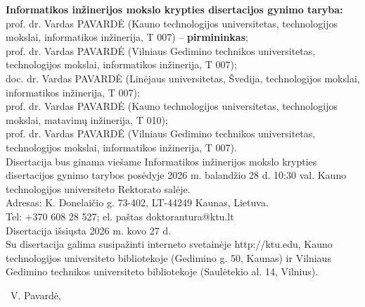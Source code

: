 \begin{titlepage}
   \noindent \textbf{Informatikos inžinerijos mokslo krypties disertacijos gynimo taryba:}\\
   prof. dr. Vardas PAVARDĖ (Kauno technologijos universitetas, technologijos mokslai, informatikos inžinerija, T 007) – \textbf{pirmininkas};\\
   prof. dr. Vardas PAVARDĖ (Vilniaus Gedimino technikos universitetas, technologijos mokslai, informatikos inžinerija, T 007);\\
   doc. dr. Vardas PAVARDĖ (Linėjaus universitetas, Švedija, technologijos mokslai, informatikos inžinerija, T 007);\\
   prof. dr. Vardas PAVARDĖ (Kauno technologijos universitetas, technologijos mokslai, matavimų inžinerija, T 010);\\
   prof. dr. Vardas PAVARDĖ (Vilniaus Gedimino technikos universitetas, technologijos mokslai, informatikos inžinerija, T 007).\\
   
   \noindent Disertacija bus ginama viešame Informatikos inžinerijos mokslo krypties disertacijos gynimo tarybos posėdyje 2026 m. balandžio 28 d. 10:30 val. Kauno technologijos universiteto Rektorato salėje.\\
   
   \noindent Adresas: K. Donelaičio g. 73-402, LT-44249 Kaunas, Lietuva.\\
   Tel: +370 608 28 527; el. paštas doktorantura@ktu.lt\\
   
   \noindent Disertacija išsiųsta 2026 m. kovo 27 d.\\
   Su disertacija galima susipažinti interneto svetainėje http://ktu.edu, Kauno technologijos universiteto bibliotekoje (Gedimino g. 50, Kaunas) ir Vilniaus Gedimino technikos universiteto bibliotekoje (Saulėtekio al. 14, Vilnius).

   \vfill

   \noindent \textcopyright\ V. Pavardė, \the\year


\end{titlepage}
